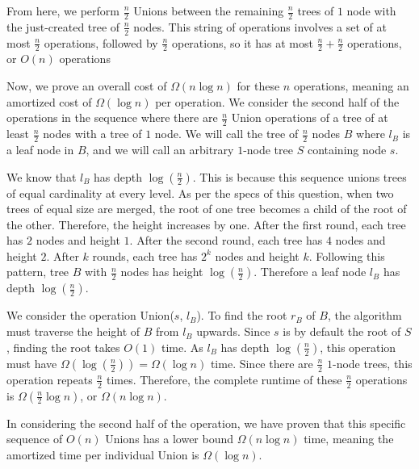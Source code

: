 \documentclass[11pt]{article}
\begin{document}
\begin{enumerate}
From here, we perform $\frac{n}{2}$ Unions between the remaining $\frac{n}{2}$ trees of $1$ node with the just-created tree of $\frac{n}{2}$ nodes. 
This string of operations involves a set of at most $\frac{n}{2}$ operations, followed by $\frac{n}{2}$ operations, so it has at most 
$\frac{n}{2} + \frac{n}{2}$ operations, or $O(n)$ operations

Now, we prove an overall cost of $\Omega(n \log n)$ for these $n$ operations, meaning an amortized cost of $\Omega(\log n)$ per operation. 
We consider the second half of the operations in the sequence where there are $\frac{n}{2}$ Union operations of a tree 
of at least $\frac{n}{2}$ nodes with a tree of $1$ node. We will call the tree of $\frac{n}{2}$ nodes $B$ where $l_B$ is a leaf node in $B$, 
and we will call an arbitrary $1$-node tree $S$ containing node $s$. 

We know that $l_B$ has depth $\log (\frac{n}{2})$. This is because this sequence unions trees of equal cardinality at every level. 
As per the specs of this question, when two trees of equal size are merged, the root of one tree becomes a child of the root of the other. 
Therefore, the height increases by one.  After the first round, each tree has $2$ nodes and height $1$. 
After the second round, each tree has $4$ nodes and height $2$. After $k$ rounds, each tree has $2^k$ nodes and height $k$. 
Following this pattern, tree $B$ with $\frac{n}{2}$ nodes has height $\log(\frac{n}{2})$. 
Therefore a leaf node $l_B$ has depth $\log(\frac{n}{2})$. 

We consider the operation Union($s$, $l_B$). To find the root $r_B$ of $B$, 
the algorithm must traverse the height of $B$ from $l_B$ upwards. Since $s$ is by default the root of $S$, finding the root takes $O(1)$ time. 
As $l_B$ has depth $\log (\frac{n}{2})$, this operation must have $\Omega (\log (\frac{n}{2})) = \Omega (\log n)$ time. 
Since there are $\frac{n}{2}$ $1$-node trees, this operation repeats $\frac{n}{2}$ times. 
Therefore, the complete runtime of these $\frac{n}{2}$ operations is $\Omega (\frac{n}{2} \log n)$, or $\Omega (n \log n)$.

In considering the second half of the operation, we have proven that this specific sequence of $O(n)$ Unions has a lower bound $\Omega (n \log n)$ time, 
meaning the amortized time per individual Union is $\Omega (\log n)$.

\end{enumerate}
\end{document}
